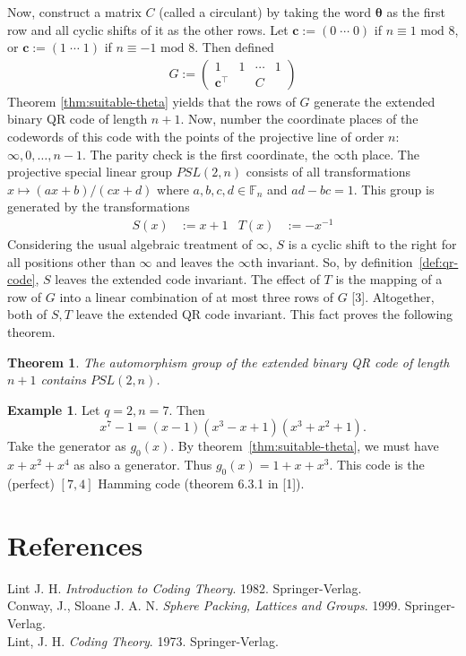 \documentclass{article}
\newcommand{\F}{\mathbb{F}}
\renewcommand{\mod}{\text{ mod }}
\newcommand{\trans}[1]{#1^\top}
\newcommand{\mt}{\mapsto}
\renewcommand{\=}{\equiv}
\renewcommand{\i}{^{-1}}
\renewcommand{\v}{\mathbf}
\theoremstyle{plain}
\newtheorem{thm}{Theorem}[subsection]
\theoremstyle{definition}
\newtheorem{exmp}{Example}[subsection]
\begin{document}
Now, construct a matrix $C$ (called a circulant) by taking the word $\v \theta$ as the first row and all cyclic shifts of it as the other rows.
Let $\v c := (0 \; \cdots \; 0)$ if $n \= 1 \mod 8$, or $\v c := (1 \; \cdots \; 1)$ if $n \= -1 \mod 8$.
Then defined
\begin{align}
  G := \begin{pmatrix}
    1 & 1 & \cdots & 1 \\
    \trans{\v c} & & C &
  \end{pmatrix}
\end{align}
Theorem \ref{thm:suitable-theta} yields that the rows of $G$ generate the extended binary QR code of length $n+1$.
Now, number the coordinate places of the codewords of this code with the points of the projective line of order $n$: $\infty, 0, \dots, n-1$.
The parity check is the first coordinate, the $\infty$th place.
The projective special linear group $PSL(2,n)$ consists of all transformations $x \mt (ax + b)/(cx + d)$ where $a, b, c, d \in \F_n$ and $ad - bc = 1$.
This group is generated by the transformations
\begin{align*}
  S(x) &:= x + 1 & T(x) &:= -x\i
\end{align*}
Considering the usual algebraic treatment of $\infty$, $S$ is a cyclic shift to the right for all positions other than $\infty$ and leaves the $\infty$th invariant.
So, by definition~\ref{def:qr-code}, $S$ leaves the extended code invariant.
The effect of $T$ is the mapping of a row of $G$ into a linear combination of at most three rows of $G$ [3].
Altogether, both of $S,T$ leave the extended QR code invariant.
This fact proves the following theorem.

\begin{thm}
\label{thm:qr-auto}
The automorphism group of the extended binary QR code of length $n+1$ contains $PSL(2,n)$.
\end{thm}

\begin{exmp}
Let $q = 2, n = 7$.
Then
$$ x^7 - 1 = (x-1) (x^3 - x + 1) (x^3 + x^2 + 1). $$
Take the generator as $g_0(x)$.
By theorem~\ref{thm:suitable-theta}, we must have $x + x^2 + x^4$ as also a generator.
Thus $g_0(x) = 1 + x + x^3$.
This code is the (perfect) $[7,4]$ Hamming code (theorem 6.3.1 in [1]).
\end{exmp}

\section*{References}


\noindent
[1] Lint J. H. \textit{Introduction to Coding Theory}. 1982. Springer-Verlag.
\\\noindent
[2] Conway, J., Sloane J. A. N. \textit{Sphere Packing, Lattices and Groups}. 1999. Springer-Verlag.
\\\noindent
[3] Lint, J. H. \textit{Coding Theory}. 1973. Springer-Verlag.
\end{document}
